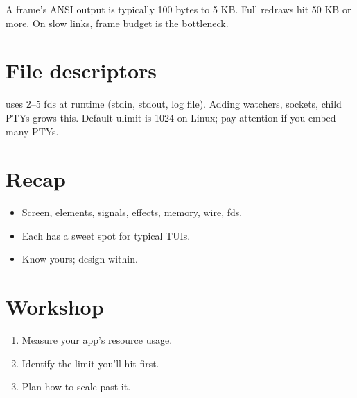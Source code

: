 A frame's ANSI output is typically 100 bytes to 5 KB. Full
redraws hit 50 KB or more. On slow links, frame budget is
the bottleneck.

\section{File descriptors}

\maya{} uses 2--5 fds at runtime (stdin, stdout, log file).
Adding watchers, sockets, child PTYs grows this. Default
ulimit is 1024 on Linux; pay attention if you embed many
PTYs.

\section{Recap}

\begin{recap}
\begin{itemize}[leftmargin=*]
  \item Screen, elements, signals, effects, memory,
    wire, fds.
  \item Each has a sweet spot for typical TUIs.
  \item Know yours; design within.
\end{itemize}
\end{recap}

\section*{Workshop}

\begin{enumerate}[leftmargin=*]
  \item Measure your app's resource usage.
  \item Identify the limit you'll hit first.
  \item Plan how to scale past it.
\end{enumerate}
